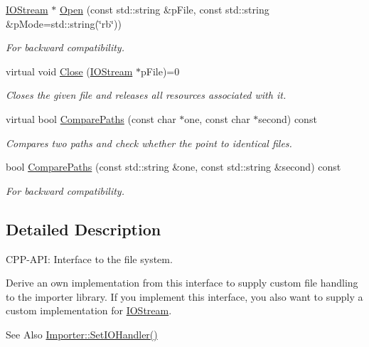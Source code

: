 \begin{DoxyCompactItemize}
\hyperlink{class_assimp_1_1_i_o_stream}{I\-O\-Stream} $\ast$ \hyperlink{class_assimp_1_1_i_o_system_aef35fabc9bd49fb83bfd4f12a94083c3}{Open} (const std\-::string \&p\-File, const std\-::string \&p\-Mode=std\-::string(\char`\"{}rb\char`\"{}))
\begin{DoxyCompactList}\small\item\em For backward compatibility. \end{DoxyCompactList}\item 
virtual void \hyperlink{class_assimp_1_1_i_o_system_a8c334d60f04bceeb6bd0157d21723f3e}{Close} (\hyperlink{class_assimp_1_1_i_o_stream}{I\-O\-Stream} $\ast$p\-File)=0
\begin{DoxyCompactList}\small\item\em Closes the given file and releases all resources associated with it. \end{DoxyCompactList}\item 
virtual bool \hyperlink{class_assimp_1_1_i_o_system_a11349a65b353ed62f655c3dd802b9062}{Compare\-Paths} (const char $\ast$one, const char $\ast$second) const 
\begin{DoxyCompactList}\small\item\em Compares two paths and check whether the point to identical files. \end{DoxyCompactList}\item 
bool \hyperlink{class_assimp_1_1_i_o_system_a279d1d4b0b2aa37800e222aad508dff1}{Compare\-Paths} (const std\-::string \&one, const std\-::string \&second) const 
\begin{DoxyCompactList}\small\item\em For backward compatibility. \end{DoxyCompactList}\end{DoxyCompactItemize}


\subsection{Detailed Description}
C\-P\-P-\/\-A\-P\-I\-: Interface to the file system. 

Derive an own implementation from this interface to supply custom file handling to the importer library. If you implement this interface, you also want to supply a custom implementation for \hyperlink{class_assimp_1_1_i_o_stream}{I\-O\-Stream}.

\begin{DoxySeeAlso}{See Also}
\hyperlink{class_assimp_1_1_importer_a1161f46318af18bb86dfe0fc3edea4df}{Importer\-::\-Set\-I\-O\-Handler()} 
\end{DoxySeeAlso}


